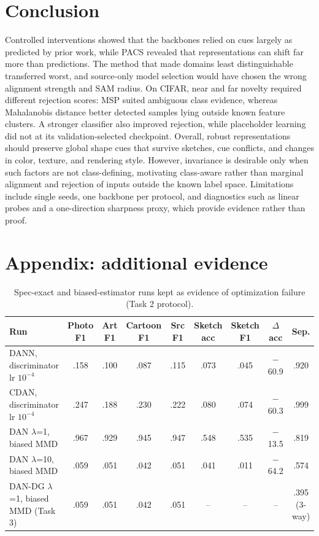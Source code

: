 \documentclass{article}
\begin{document}
\section{Conclusion}
Controlled interventions showed that the backbones relied on cues largely as predicted by prior work, while PACS revealed that representations can shift far more than predictions. The method that made domains least distinguishable transferred worst, and source-only model selection would have chosen the wrong alignment strength and SAM radius. On CIFAR, near and far novelty required different rejection scores: MSP suited ambiguous class evidence, whereas Mahalanobis distance better detected samples lying outside known feature clusters. A stronger classifier also improved rejection, while placeholder learning did not at its validation-selected checkpoint. Overall, robust representations should preserve global shape cues that survive sketches, cue conflicts, and changes in color, texture, and rendering style. However, invariance is desirable only when such factors are not class-defining, motivating class-aware rather than marginal alignment and rejection of inputs outside the known label space. Limitations include single seeds, one backbone per protocol, and diagnostics such as linear probes and a one-direction sharpness proxy, which provide evidence rather than proof.




\appendix
\section{Appendix: additional evidence}
\begin{table}[h]
\centering\small
\caption{Spec-exact and biased-estimator runs kept as evidence of optimization failure (Task 2 protocol).}
\label{tab:unstable}
\setlength{\tabcolsep}{4pt}
\begin{tabular}{@{}lcccccccc@{}}
\toprule
Run & Photo F1 & Art F1 & Cartoon F1 & Src F1 & Sketch acc & Sketch F1 & $\Delta$acc & Sep. \\
\midrule
DANN, discriminator lr $10^{-4}$ & .158 & .100 & .087 & .115 & .073 & .045 & $-$60.9 & .920 \\
CDAN, discriminator lr $10^{-4}$ & .247 & .188 & .230 & .222 & .080 & .074 & $-$60.3 & .999 \\
DAN $\lambda$=1, biased MMD & .967 & .929 & .945 & .947 & .548 & .535 & $-$13.5 & .819 \\
DAN $\lambda$=10, biased MMD & .059 & .051 & .042 & .051 & .041 & .011 & $-$64.2 & .574 \\
DAN-DG $\lambda$=1, biased MMD (Task 3) & .059 & .051 & .042 & .051 & -- & -- & -- & .395 (3-way) \\
\bottomrule
\end{tabular}
\end{table}
\end{document}
